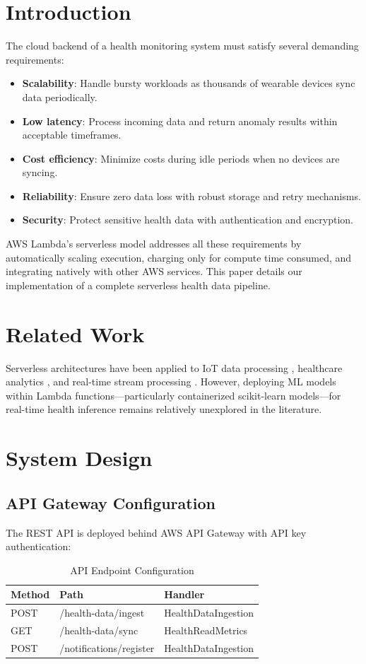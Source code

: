 \documentclass[conference]{IEEEtran}
\begin{document}
\section{Introduction}
The cloud backend of a health monitoring system must satisfy several demanding requirements:
\begin{itemize}
    \item \textbf{Scalability}: Handle bursty workloads as thousands of wearable devices sync data periodically.
    \item \textbf{Low latency}: Process incoming data and return anomaly results within acceptable timeframes.
    \item \textbf{Cost efficiency}: Minimize costs during idle periods when no devices are syncing.
    \item \textbf{Reliability}: Ensure zero data loss with robust storage and retry mechanisms.
    \item \textbf{Security}: Protect sensitive health data with authentication and encryption.
\end{itemize}

AWS Lambda's serverless model addresses all these requirements by automatically scaling execution, charging only for compute time consumed, and integrating natively with other AWS services. This paper details our implementation of a complete serverless health data pipeline.

\section{Related Work}
Serverless architectures have been applied to IoT data processing \cite{serverless_iot}, healthcare analytics \cite{cloud_health1}, and real-time stream processing \cite{stream_proc}. However, deploying ML models within Lambda functions---particularly containerized scikit-learn models---for real-time health inference remains relatively unexplored in the literature.

\section{System Design}

\subsection{API Gateway Configuration}
The REST API is deployed behind AWS API Gateway with API key authentication:

\begin{table}[H]
\centering
\caption{API Endpoint Configuration}
\label{tab:endpoints}
\begin{tabular}{llp{3cm}}
\toprule
\textbf{Method} & \textbf{Path} & \textbf{Handler} \\
\midrule
POST & /health-data/ingest & HealthDataIngestion \\
GET & /health-data/sync & HealthReadMetrics \\
POST & /notifications/register & HealthDataIngestion \\
\bottomrule
\end{tabular}
\end{table}
\end{document}
